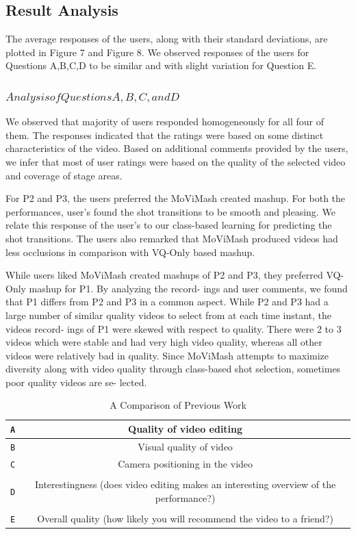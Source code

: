 \documentclass{new}
\begin{document}
\subsection{Result Analysis}
The average responses of the users, along with their standard
deviations, are plotted in Figure 7 and Figure 8. We observed responses of the users for Questions A,B,C,D to be similar and with
slight variation for Question E.

\subsubsection{$Analysis of Questions A, B, C, and D$}

We observed that majority of users responded homogeneously
for all four of them. The responses indicated that the ratings were
based on some distinct characteristics of the video. Based on additional comments provided by the users, we infer that most of user ratings were based on the quality of the selected video and coverage
of stage areas.

For P2 and P3, the users preferred the MoViMash created mashup.
For both the performances, user's found the shot transitions to be
smooth and pleasing. We relate this response of the user’s to our
class-based learning for predicting the shot transitions. The users
also remarked that MoViMash produced videos had less occlusions
in comparison with VQ-Only based mashup.

While users liked MoViMash created mashups of P2 and P3,
they preferred VQ-Only mashup for P1. By analyzing the record-
ings and user comments, we found that P1 differs from P2 and P3 in
a common aspect. While P2 and P3 had a large number of similar
quality videos to select from at each time instant, the videos record-
ings of P1 were skewed with respect to quality. There were 2 to 3
videos which were stable and had very high video quality, whereas
all other videos were relatively bad in quality. Since MoViMash
attempts to maximize diversity along with video quality through
class-based shot selection, sometimes poor quality videos are se-
lected.
\begin{table}
\centering
\caption{A Comparison of Previous Work}
\begin{tabular*}{\columnwidth}{c{1cm}|c{7cm}} \hline
\texttt A&Quality of video editing  \\ \hline
\texttt B&Visual quality of video  \\ \hline
\texttt C&Camera positioning in the video  \\ \hline\\
\texttt D&Interestingness (does video editing makes an interesting
overview of the performance?)  \\ \hline\\
\texttt E&Overall quality (how likely you will recommend the video to
a friend?)  \\ \hline
\end{tabular*}
\end{table}
\end{document}
